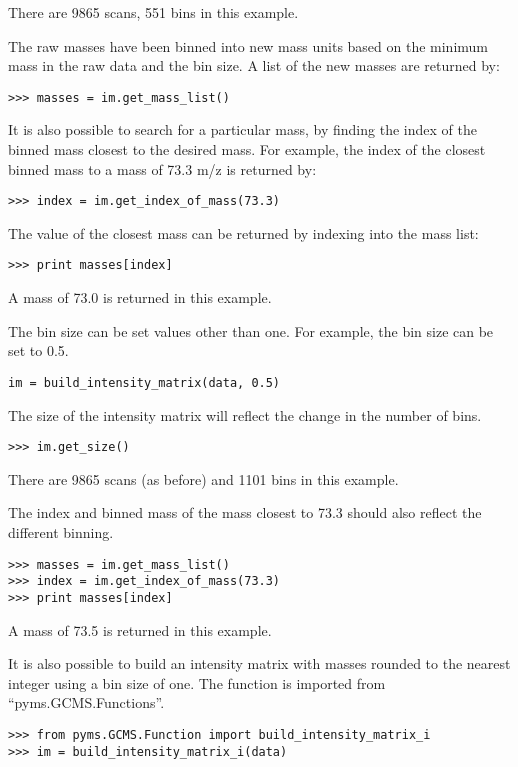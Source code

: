 There are 9865 scans, 551 bins in this example.

The raw masses have been binned into new mass units based on the minimum mass
in the raw data and the bin size. A list of the new masses are returned by:

\begin{verbatim}
>>> masses = im.get_mass_list()
\end{verbatim}

It is also possible to search for a particular mass, by finding the index of the
binned mass closest to the desired mass. For example, the index of the closest
binned mass to a mass of 73.3 m/z is returned by:

\begin{verbatim}
>>> index = im.get_index_of_mass(73.3)
\end{verbatim}

The value of the closest mass can be returned by indexing into the mass list:
\begin{verbatim}
>>> print masses[index]
\end{verbatim}

A mass of 73.0 is returned in this example.

The bin size can be set values other than one. For example, the bin size can be
set to 0.5.

\begin{verbatim}
im = build_intensity_matrix(data, 0.5)
\end{verbatim}

The size of the intensity matrix will reflect the change in the number of bins.
\begin{verbatim}
>>> im.get_size()
\end{verbatim}

There are 9865 scans (as before) and 1101 bins in this example.

The index and binned mass of the mass closest to 73.3 should also reflect the
different binning.
\begin{verbatim}
>>> masses = im.get_mass_list()
>>> index = im.get_index_of_mass(73.3)
>>> print masses[index]
\end{verbatim}

A mass of 73.5 is returned in this example.

It is also possible to build an intensity matrix with masses rounded to the
nearest integer using a bin size of one. The function is imported from
``pyms.GCMS.Functions''.
\begin{verbatim}
>>> from pyms.GCMS.Function import build_intensity_matrix_i
>>> im = build_intensity_matrix_i(data)
\end{verbatim}

